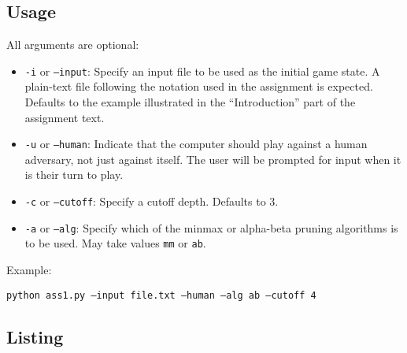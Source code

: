 \documentclass[letterpaper, 12pt]{article}
\numberwithin{theorem}{section}
\begin{document}
\subsection{Usage}
All arguments are optional:
\begin{itemize}
	\item \texttt{-i} or \texttt{--input}: Specify an input file to be used as the initial game state. A plain-text file following the notation used in the assignment is expected. Defaults to the example illustrated in the ``Introduction'' part of the assignment text.
	\item \texttt{-u} or \texttt{--human}: Indicate that the computer should play against a human adversary, not just against itself. The user will be prompted for input when it is their turn to play.
	\item \texttt{-c} or \texttt{--cutoff}: Specify a cutoff depth. Defaults to 3.
	\item \texttt{-a} or \texttt{--alg}: Specify which of the minmax or alpha-beta pruning algorithms is to be used. May take values \texttt{mm} or \texttt{ab}.
\end{itemize}
Example:

\texttt{python ass1.py --input file.txt --human --alg ab --cutoff 4}

\subsection{Listing}

\end{document}
